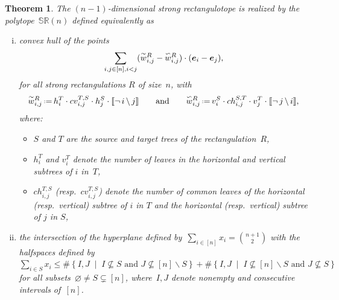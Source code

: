 \documentclass{amsart}
\newtheorem{theorem}{Theorem}%
\theoremstyle{definition}
\renewcommand{\b}[1]{{\boldsymbol{#1}}} %
\newcommand{\set}[2]{\left\{ #1 \;\middle|\; #2 \right\}} %
\newcommand{\ssm}{\smallsetminus} %
\newcommand{\eqdef}{\mbox{\,\raisebox{0.2ex}{\scriptsize\ensuremath{\mathrm:}}\ensuremath{=}\,}} %
\newcommand{\polytope}[1]{\mathds{#1}} %
\newcommand{\SRP}{\polytope{SR}} %
\newcommand{\yin}[1]{\smash{\overset{\sim}{#1}}}
\newcommand{\yang}[1]{\smash{\overset{\backsim}{#1}}}
\begin{document}
\begin{theorem}
  The $(n-1)$-dimensional strong rectangulotope is realized by the polytope~$\SRP (n)$ defined equivalently as
  \begin{enumerate}[(i)]
  \item convex hull of the points
  \[
  \sum_{i,j\in [n], i< j} (\yin{w}^R_{i,j} - \yang{w}^R_{i,j})\cdot (\b{e}_i - \b{e}_j),
  \]
   for all strong rectangulations $R$ of size~$n$, with
  \[
    \yin{w}^R_{i,j} \eqdef h^T_i \cdot cv^{T,S}_{i,j}\cdot h^S_ j\cdot \llbracket \neg \, i \, \backslash \, j \rrbracket
    \qquad\text{and}\qquad
    \yang{w}^R_{i,j} \eqdef v^S_i \cdot ch^{S,T}_{i,j}\cdot v^T_j \cdot \llbracket \neg \, j \, \backslash \, i \rrbracket,
  \]
 where:
  \begin{itemize}
  \item $S$ and $T$ are the source and target trees of the rectangulation~$R$,
  \item $h^T_i$ and $v^T_i$ denote the number of leaves in the horizontal and vertical subtrees of $i$ in~$T$,
  \item $ch^{T,S}_{i,j}$ (resp.~$cv^{T,S}_{i,j}$) denote the number of common leaves of the horizontal (resp.~vertical) subtree of $i$ in $T$ and the horizontal (resp.~vertical) subtree of $j$ in $S$,
  \end{itemize}
  \item the intersection of the hyperplane defined by~$\sum_{i \in [n]} x_i = \binom{n+1}{2}$ with the halfspaces defined by~$\sum_{i \in S} x_i \le \#\set{I,J}{I \not\subseteq S \text{ and } J \not\subseteq [n] \ssm S} + \#\set{I,J}{I \not\subseteq [n] \ssm S \text{ and } J \not\subseteq S}$ for all subsets~$\varnothing \ne S \subsetneq [n]$, where~$I,J$ denote nonempty and consecutive intervals of~$[n]$.
  \end{enumerate}
\end{theorem}

\end{document}

